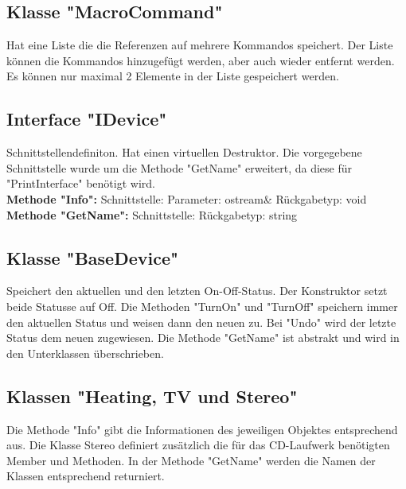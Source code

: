 \documentclass[12pt,a4paper]{article}
\begin{document}
\subsection {Klasse "MacroCommand"}
Hat eine Liste die die Referenzen auf mehrere Kommandos speichert. Der Liste können die Kommandos hinzugefügt werden, aber auch wieder entfernt werden. Es können nur maximal 2 Elemente in der Liste gespeichert werden.
\\

\subsection {Interface "IDevice"}
Schnittstellendefiniton. Hat einen virtuellen Destruktor. Die vorgegebene Schnittstelle wurde um die Methode "GetName" erweitert, da diese für "PrintInterface" benötigt wird.
\\

\textbf {Methode "Info": } 
\newline
Schnittstelle:
\newline
Parameter: ostream\&
\newline
Rückgabetyp: void
\\

\textbf {Methode "GetName": } 
\newline
Schnittstelle:
\newline
Rückgabetyp: string
\\

\subsection {Klasse "BaseDevice"}
Speichert den aktuellen und den letzten On-Off-Status. Der Konstruktor setzt beide Statusse auf Off. Die Methoden "TurnOn" und "TurnOff" speichern immer den aktuellen Status und weisen dann den neuen zu. Bei "Undo" wird der letzte Status dem neuen zugewiesen.
Die Methode "GetName" ist abstrakt und wird in den Unterklassen überschrieben.
\\

\subsection {Klassen "Heating, TV und Stereo"}
Die Methode "Info" gibt die Informationen des jeweiligen Objektes entsprechend aus. Die Klasse Stereo definiert zusätzlich die für das CD-Laufwerk benötigten Member und Methoden. In der Methode "GetName" werden die Namen der Klassen entsprechend returniert.
\\
\end{document}

